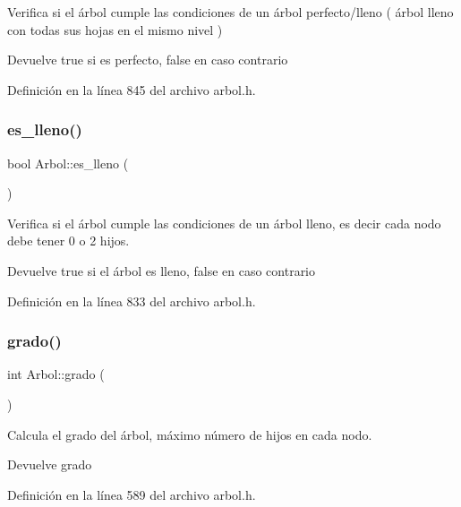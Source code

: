 Verifica si el árbol cumple las condiciones de un árbol perfecto/lleno ( árbol lleno con todas sus hojas en el mismo nivel ) 

\begin{DoxyReturn}{Devuelve}
true si es perfecto, false en caso contrario 
\end{DoxyReturn}


Definición en la línea 845 del archivo arbol.\+h.

\mbox{\label{classArbol_a14ccdbb79a82bf19a24449acaea6c413}} 
\subsubsection{\texorpdfstring{es\+\_\+lleno()}{es\_lleno()}}
{\footnotesize\ttfamily bool Arbol\+::es\+\_\+lleno (\begin{DoxyParamCaption}{ }\end{DoxyParamCaption})}



Verifica si el árbol cumple las condiciones de un árbol lleno, es decir cada nodo debe tener 0 o 2 hijos. 

\begin{DoxyReturn}{Devuelve}
true si el árbol es lleno, false en caso contrario 
\end{DoxyReturn}


Definición en la línea 833 del archivo arbol.\+h.

\mbox{\label{classArbol_a99e608849650b891c34852a81f93d4ab}} 
\subsubsection{\texorpdfstring{grado()}{grado()}}
{\footnotesize\ttfamily int Arbol\+::grado (\begin{DoxyParamCaption}{ }\end{DoxyParamCaption})}



Calcula el grado del árbol, máximo número de hijos en cada nodo. 

\begin{DoxyReturn}{Devuelve}
grado 
\end{DoxyReturn}


Definición en la línea 589 del archivo arbol.\+h.

